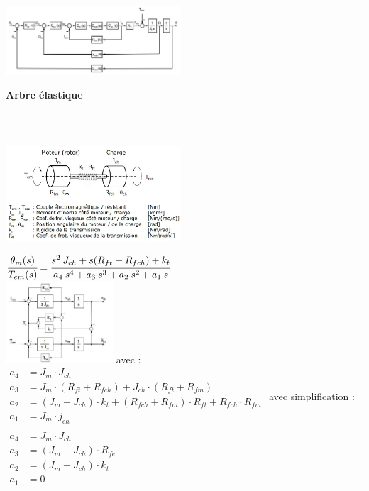\documentclass[	DIV=calc,%
							paper=a4,%
							fontsize=10pt,%
							twocolumn]{scrartcl} %
\newcounter{mycounter}
\newcommand{\formdesc}[1]{\large\textbf{#1} \addtocounter{mycounter}{1} \hfill \themycounter \\ \vspace{-3mm} \hrule \vspace{2mm}}
\begin{document}
\includegraphics[width=0.49\textwidth]{img/stad_facto_2.JPG}

\formdesc{Arbre élastique }

\includegraphics[width=0.49\textwidth]{img/arbre_elastique.JPG}

$\cfrac{\theta_m(s)}{T_{em}(s)} = \cfrac{s^2\:J_{ch} + s(R_{ft} + R_{fch}) + k_t}{a_4\: s^4 + a_3\: s^3 + a_2 \:s^2 + a_1 \:s}$\\
{\centering
\includegraphics[width=0.3\textwidth]{img/arbre_elastique_2.JPG}
}
avec :\\
{\normalsize
$
    \begin{aligned}
        a_4 &= J_m \cdot J_{ch}\\
        a_3 &= J_m \cdot  (R_{ft} + R_{fch}) + J_{ch} \cdot (R_{ft} + R_{fm})\\
        a_2 &= (J_m + J_{ch})\cdot k_t + (R_{fch} + R_{fm}) \cdot R_{ft} + R_{fch} \cdot R_{fm}\\
        a_1 &= J_m \cdot j_{ch}\\
    \end{aligned}
$
}
avec simplification : 
{\normalsize
$
    \begin{aligned}
        a_4 &= J_m \cdot J_{ch}\\
        a_3 &=( J_m + J_{ch}) \cdot R_{fe}\\
        a_2 &= (J_m + J_{ch})\cdot k_t\\
        a_1 &= 0\\
    \end{aligned}
$
}
\end{document}
